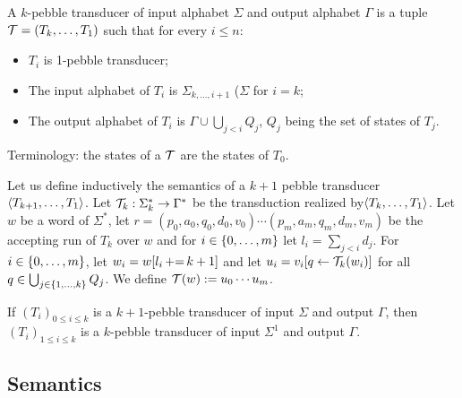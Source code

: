 \begin{definition}
A $k$-pebble transducer of input alphabet $\Sigma$ and output alphabet $\Gamma$ is a tuple ${\mathcal T}=(T_k,\dots,T_{1})$ such that for every $i\leq n$:
\begin{itemize}
\item  $T_i$ is 1-pebble transducer;
\item  The input alphabet of $T_i$ is $\Sigma_{k,\ldots,i+1}$ ($\Sigma$ for $i=k$;
\item  The output alphabet of $T_i$ is $\Gamma\cup\bigcup_{j<i} Q_j$, $Q_j$ being the set of states of $T_j$.
\end{itemize} 
Terminology: the states of a ${\mathcal T}$ are the states of $T_0$. 
\end{definition}

Let us define inductively the semantics of a $k+1$ pebble transducer $\langle T_{k+1},\ldots, T_1 \rangle$.
Let ${\mathcal T}_k:\Sigma_k^*\rightarrow \Gamma^*$ be the transduction realized by$\langle T_{k},\ldots, T_1 \rangle$.
Let $w$ be a word of $\Sigma^*$, let $r=(p_0,a_0,q_0,d_0,v_0)\cdots (p_m,a_m,q_m,d_m,v_m)$ be the accepting run of $T_k$ over $w$ and for  $i\in \{0,\ldots,m\}$ let  $l_i=\sum_{j< i }d_j$.
For  $i\in \{0,\ldots,m\}$, let $w_i=w[l_i\mathop{{+}{=}} k+1]$ and let $u_i=v_i[q\leftarrow {\mathcal T}_k(w_i)]$ for all $q\in \bigcup_{j\in \{1,\ldots,k\}}Q_j$.
We define ${\mathcal T}(w):=u_0\cdots u_m$.

\begin{remark}
If $(T_i)_{0 \leq i\leq k}$ is a $k+1$-pebble transducer of input $\Sigma$ and output $\Gamma$, then $(T_i)_{1\leq i\leq k}$ is a $k$-pebble transducer of input $\Sigma^1$ and output $\Gamma$.
\end{remark}

\subsection{Semantics}

